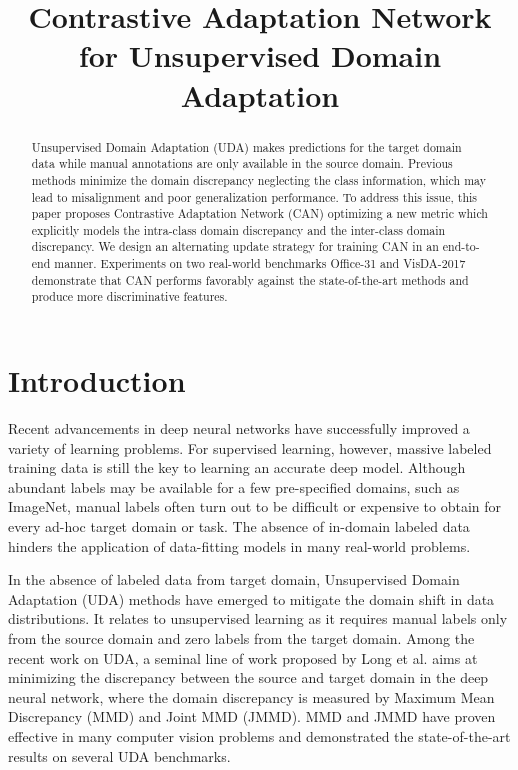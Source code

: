 \documentclass[conference]{IEEEtran}
\begin{document}
\title{Contrastive Adaptation Network for Unsupervised Domain Adaptation}

\author{
}

\maketitle

\begin{abstract}
Unsupervised Domain Adaptation (UDA) makes predictions for the target domain data while manual annotations are only available in the source domain.
Previous methods minimize the domain discrepancy neglecting the class information, which may lead to misalignment and poor generalization performance.
To address this issue, this paper proposes Contrastive Adaptation Network (CAN) optimizing a new metric which explicitly models the intra-class domain discrepancy and the inter-class domain discrepancy.
We design an alternating update strategy for training CAN in an end-to-end manner. Experiments on two real-world benchmarks Office-31 and VisDA-2017 demonstrate that CAN performs favorably against the state-of-the-art methods and produce more discriminative features.
\end{abstract}


\section{Introduction}
Recent advancements in deep neural networks \cite{b1} have successfully improved a variety of learning problems.
For supervised learning, however, massive labeled training data is still the key to learning an accurate deep model.
Although abundant labels may be available for a few pre-specified domains, such as ImageNet, manual labels often turn out to be difficult or expensive 
to obtain for every ad-hoc target domain or task. The absence of in-domain labeled data hinders the application of data-fitting models in many real-world problems.

In the absence of labeled data from target domain, Unsupervised Domain Adaptation (UDA) methods have emerged to mitigate the domain shift in data distributions.
It relates to unsupervised learning as it requires manual labels only from the source domain and zero labels from the target domain.
Among the recent work on UDA, a seminal line of work proposed by Long et al. aims at minimizing the discrepancy between the source and target domain in the deep neural network, where the domain discrepancy is measured by Maximum Mean Discrepancy (MMD) and Joint MMD (JMMD).
MMD and JMMD have proven effective in many computer vision problems and demonstrated the state-of-the-art results on several UDA benchmarks.
\end{document}
